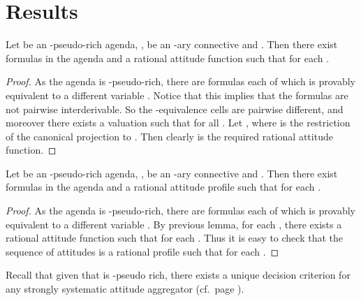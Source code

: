 \documentclass{llncs}
\numberwithin{equation}{section}
\begin{document}
\section{Results}
\label{Sec:Results}
\begin{lemma}
Let  be an -pseudo-rich agenda, ,  be an -ary connective and .
Then there exist formulas  in the agenda and a rational attitude function  such that  for each .
\end{lemma}
\begin{proof}
As the agenda is -pseudo-rich, there are formulas  each of which is provably equivalent to a different variable . Notice that this implies that the formulas  are not pairwise interderivable. So the -equivalence cells  are pairwise different, and moreover there exists a valuation  such that  for all .
Let , where  is the restriction of the canonical projection  to . Then clearly  is the required rational attitude function.
\end{proof}

\begin{lemma}\label{lemma2}
Let  be an -pseudo-rich agenda, ,  be an -ary connective and .
Then there exist formulas  in the agenda and a rational attitude profile  such that  for each .
\end{lemma}
\begin{proof}
As the agenda is -pseudo-rich, there are formulas  each of which is provably equivalent to a different variable . By previous lemma, for each , there exists a rational attitude function  such that  for each .
Thus it is easy to check that the sequence of attitudes is  a rational profile such that  for each .
\end{proof}

Recall that given that  is -pseudo rich, there exists a unique decision criterion for any strongly systematic attitude aggregator  (cf.\ page \pageref{page:unique:decision:criterion}).
\end{document}
